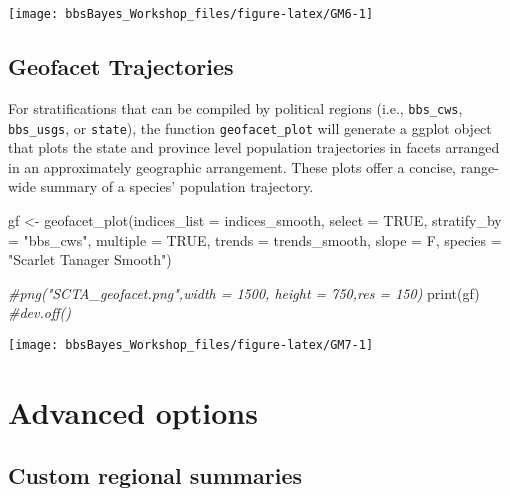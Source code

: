 \documentclass[
]{book}
\newenvironment{Shaded}{\begin{snugshade}}{\end{snugshade}}
\newcommand{\AttributeTok}[1]{\textcolor[rgb]{0.77,0.63,0.00}{#1}}
\newcommand{\CommentTok}[1]{\textcolor[rgb]{0.56,0.35,0.01}{\textit{#1}}}
\newcommand{\ConstantTok}[1]{\textcolor[rgb]{0.00,0.00,0.00}{#1}}
\newcommand{\FunctionTok}[1]{\textcolor[rgb]{0.00,0.00,0.00}{#1}}
\newcommand{\NormalTok}[1]{#1}
\newcommand{\OtherTok}[1]{\textcolor[rgb]{0.56,0.35,0.01}{#1}}
\newcommand{\StringTok}[1]{\textcolor[rgb]{0.31,0.60,0.02}{#1}}
\begin{document}
\begin{center}\texttt{[image: bbsBayes\_Workshop\_files/figure-latex/GM6-1]} \end{center}

\hypertarget{geofacet-trajectories}{%
\section{Geofacet Trajectories}\label{geofacet-trajectories}}

For stratifications that can be compiled by political regions (i.e., \texttt{bbs\_cws}, \texttt{bbs\_usgs}, or \texttt{state}), the function \texttt{geofacet\_plot} will generate a ggplot object that plots the state and province level population trajectories in facets arranged in an approximately geographic arrangement. These plots offer a concise, range-wide summary of a species' population trajectory.

\begin{Shaded}
\begin{Highlighting}[]
\NormalTok{  gf }\OtherTok{\textless{}{-}} \FunctionTok{geofacet\_plot}\NormalTok{(}\AttributeTok{indices\_list =}\NormalTok{ indices\_smooth,}
                     \AttributeTok{select =} \ConstantTok{TRUE}\NormalTok{,}
                     \AttributeTok{stratify\_by =} \StringTok{"bbs\_cws"}\NormalTok{,}
                     \AttributeTok{multiple =} \ConstantTok{TRUE}\NormalTok{,}
                     \AttributeTok{trends =}\NormalTok{ trends\_smooth,}
                     \AttributeTok{slope =}\NormalTok{ F,}
                     \AttributeTok{species =} \StringTok{"Scarlet Tanager Smooth"}\NormalTok{)}
  
  \CommentTok{\#png("SCTA\_geofacet.png",width = 1500, height = 750,res = 150)}
  \FunctionTok{print}\NormalTok{(gf)}
  \CommentTok{\#dev.off()}
\end{Highlighting}
\end{Shaded}

\begin{center}\texttt{[image: bbsBayes\_Workshop\_files/figure-latex/GM7-1]} \end{center}

\hypertarget{Adv}{%
\chapter{Advanced options}\label{Adv}}

\hypertarget{custom-regional-summaries}{%
\section{Custom regional summaries}\label{custom-regional-summaries}}
\end{document}
